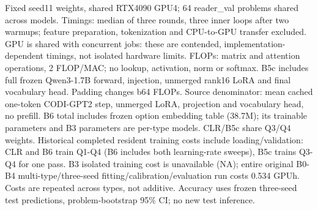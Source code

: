 \begin{table}[t]
\centering\scriptsize
\caption{T6: CODI-GPT2 precision and query cost}
\label{tab:t6-cost-precision}
\par\smallskip\parbox{\textwidth}{\scriptsize Fixed seed11 weights, shared RTX4090 GPU4; 64 reader\_val problems shared across models. Timings: median of three rounds, three inner loops after two warmups; feature preparation, tokenization and CPU-to-GPU transfer excluded. GPU is shared with concurrent jobs: these are contended, implementation-dependent timings, not isolated hardware limits. FLOPs: matrix and attention operations, 2 FLOP/MAC; no lookup, activation, norm or softmax. B5c includes full frozen Qwen3-1.7B forward, injection, unmerged rank16 LoRA and final vocabulary head. Padding changes b64 FLOPs. Source denominator: mean cached one-token CODI-GPT2 step, unmerged LoRA, projection and vocabulary head, no prefill. B6 total includes frozen option embedding table (38.7M); its trainable parameters and B3 parameters are per-type models. CLR/B5c share Q3/Q4 weights. Historical completed resident training costs include loading/validation: CLR and B6 train Q1-Q4 (B6 includes both learning-rate sweeps), B5c trains Q3-Q4 for one pass. B3 isolated training cost is unavailable (NA); entire original B0-B4 multi-type/three-seed fitting/calibration/evaluation run costs 0.534 GPUh. Costs are repeated across types, not additive. Accuracy uses frozen three-seed test predictions, problem-bootstrap 95\% CI; no new test inference.}
\end{table}
